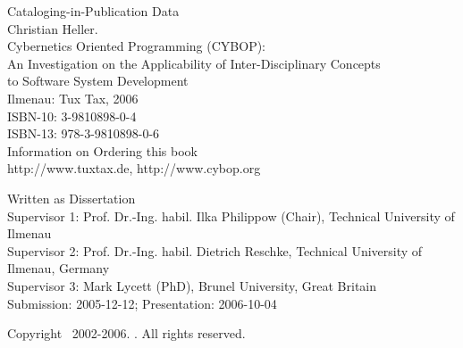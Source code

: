 %
%
%
%
%
%
%

\small{Cataloging-in-Publication Data\\
    Christian Heller.\\
    Cybernetics Oriented Programming (CYBOP):\\
    An Investigation on the Applicability of Inter-Disciplinary Concepts\\
    to Software System Development\\
    Ilmenau: Tux Tax, 2006\\
    ISBN-10: 3-9810898-0-4\\
    ISBN-13: 978-3-9810898-0-6}\\

\small{Information on Ordering this book\\
    http://www.tuxtax.de, http://www.cybop.org}

\small{Written as Dissertation\\
    Supervisor 1: Prof. Dr.-Ing. habil. Ilka Philippow (Chair), Technical University of Ilmenau\\
    Supervisor 2: Prof. Dr.-Ing. habil. Dietrich Reschke, Technical University of Ilmenau, Germany\\
    Supervisor 3: Mark Lycett (PhD), Brunel University, Great Britain\\
    Submission: 2005-12-12; Presentation: 2006-10-04}

\small{Copyright \textcopyright\ 2002-2006. \authormacro. All rights reserved.}

